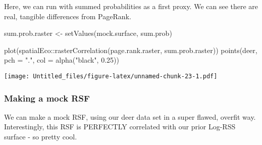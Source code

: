 \documentclass[
]{article}
\newenvironment{Shaded}{\begin{snugshade}}{\end{snugshade}}
\newcommand{\AttributeTok}[1]{\textcolor[rgb]{0.77,0.63,0.00}{#1}}
\newcommand{\DecValTok}[1]{\textcolor[rgb]{0.00,0.00,0.81}{#1}}
\newcommand{\FloatTok}[1]{\textcolor[rgb]{0.00,0.00,0.81}{#1}}
\newcommand{\FunctionTok}[1]{\textcolor[rgb]{0.00,0.00,0.00}{#1}}
\newcommand{\NormalTok}[1]{#1}
\newcommand{\OtherTok}[1]{\textcolor[rgb]{0.56,0.35,0.01}{#1}}
\newcommand{\SpecialCharTok}[1]{\textcolor[rgb]{0.00,0.00,0.00}{#1}}
\newcommand{\StringTok}[1]{\textcolor[rgb]{0.31,0.60,0.02}{#1}}
\begin{document}
Here, we can run with summed probabilities as a first proxy. We can see
there are real, tangible differences from PageRank.

\begin{Shaded}
\begin{Highlighting}[]
\NormalTok{sum.prob.raster }\OtherTok{\textless{}{-}} \FunctionTok{setValues}\NormalTok{(mock.surface, sum.prob)}

\FunctionTok{plot}\NormalTok{(spatialEco}\SpecialCharTok{::}\FunctionTok{rasterCorrelation}\NormalTok{(page.rank.raster, sum.prob.raster))}
\FunctionTok{points}\NormalTok{(deer, }\AttributeTok{pch =} \StringTok{"."}\NormalTok{, }\AttributeTok{col =} \FunctionTok{alpha}\NormalTok{(}\StringTok{"black"}\NormalTok{, }\FloatTok{0.25}\NormalTok{))}
\end{Highlighting}
\end{Shaded}

\texttt{[image: Untitled\_files/figure-latex/unnamed-chunk-23-1.pdf]}

\hypertarget{making-a-mock-rsf}{%
\subsubsection{Making a mock RSF}\label{making-a-mock-rsf}}

We can make a mock RSF, using our deer data set in a super flawed,
overfit way. Interestingly, this RSF is PERFECTLY correlated with our
prior Log-RSS surface - so pretty cool.

\begin{Shaded}
\end{Shaded}
\end{document}
